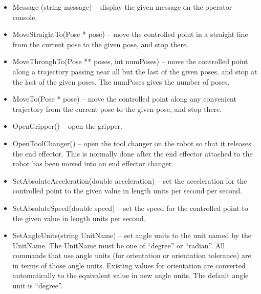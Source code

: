 \begin{itemize}
\item \sf Message (string message) \rm -- display the given \sf message \rm
  on the operator console.\\

\item \sf MoveStraightTo(Pose * pose) \rm -- move the controlled point in a
  straight line from the current pose to the given \sf pose\rm, and stop
  there.\\

\item \sf MoveThroughTo(Pose ** poses, int numPoses) \rm -- move the
  controlled point along a trajectory passing near all but the last of the
  given \sf poses\rm, and stop at the last of the given \sf poses\rm.
  The \sf numPoses \rm gives the number of poses.\\

\item \sf MoveTo(Pose * pose) \rm -- move the controlled point along any
  convenient trajectory from the current pose to the given \sf pose\rm,
  and stop there.\\

\item \sf OpenGripper() \rm -- open the gripper.\\

\item \sf OpenToolChanger() \rm -- open the tool changer on the robot so
  that it releases the end effector.  This is normally done after the end
  effector attached to the robot has been moved into an end effector
  changer.\\

\item \sf SetAbsoluteAcceleration(double acceleration) \rm -- set the
  acceleration for the controlled point to the given value in length units
  per second per second.\\

\item \sf SetAbsoluteSpeed(double speed) \rm -- set the speed for the
  controlled point to the given value in length units per second.\\

\item \sf SetAngleUnits(string UnitName) \rm -- set angle units to the unit
  named by the \sf UnitName\rm.  The \sf UnitName \rm must be one of
  ``degree'' or ``radian''. All commands that use angle units (for
  orientation or orientation tolerance) are in terms of those angle
  units. Existing values for orientation are converted automatically to the
  equivalent value in new angle units.  The default angle unit is
  ``degree''.\\


\end{itemize}
